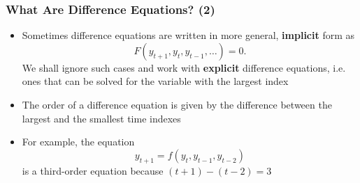 \documentclass[10pt,usenames,dvipsnames]{beamer}
\theoremstyle{definition}
\begin{document}
%

\begin{frame}[fragile]
	\frametitle{What Are Difference Equations? (2)}
	\begin{itemize}
		\item Sometimes difference equations are written in more general, \textbf{implicit} form as \[ F(y_{t+1},y_t,y_{t-1},\ldots)=0. \]
		We shall ignore such cases and work with \textbf{explicit} difference equations, i.e. ones that can be solved for the variable with the largest index
		\item The order of a difference equation is given by the difference between the largest and the smallest time indexes
		\item For example, the equation
		\[ y_{t+1} = f(y_t, y_{t-1}, y_{t-2}) \]
		is a third-order equation because $(t+1) - (t-2) = 3$
	\end{itemize}
\end{frame}
\end{document}
